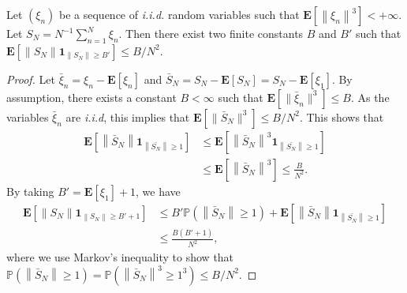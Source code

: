 \documentclass[sigconf]{acmart}
\newcommand\esp[1]{\mathbf{E}\left[#1\right]}
\newcommand\sesp[1]{\mathbf{E}[#1]}
\newcommand\norm[1]{\left\|#1\right\|}
\newcommand\snorm[1]{\|#1\|}
\newcommand\proba[1]{\mathbb{P}\left(#1\right)}
\begin{document}
\begin{lemma}
  \label{lem:concentration}
  Let $(\xi_n)$ be a sequence of \emph{i.i.d.} random variables such
  that $\esp{\norm{\xi_n}^3}<+\infty$. Let
  $S_N=N^{-1}\sum_{n=1}^N\xi_n$. Then there exist two finite constants
  $B$ and $B'$ such that
  $\esp{\norm{S_N}\mathbf{1}_{\norm{S_N}\ge B'}}\le B/N^2$.
\end{lemma}


\begin{proof}%
  Let $\bar{\xi}_n=\xi_n-\sesp{\xi_n}$ and
  $\bar{S}_N=S_N-\esp{S_N}=S_N-\esp{\xi_1}$. By assumption, there
  exists a constant $B<\infty$ such that
  $\sesp{\snorm{\bar{\xi}_n}^3}\le B$. As the variables $\bar{\xi}_n$
  are \emph{i.i.d}, this implies that
  $\sesp{\snorm{\bar{S}_N}^3}\le B/N^2$. This shows that
  \begin{align*}
    \esp{\norm{\bar{S}_N}\mathbf{1}_{\norm{\bar{S_N}}\ge1}}
    &\le \esp{\norm{\bar{S}_N}^3\mathbf{1}_{\norm{\bar{S_N}}\ge1}}\\
    &\le \esp{\norm{\bar{S}_N}^3}\le
      \frac{B}{N^2}. 
  \end{align*}
  By taking $B'=\esp{\xi_1}+1$, we have
  \begin{align*}
    \esp{\norm{S_N}\mathbf{1}_{\norm{S_N}\ge B'+1}}
    &\le
      B'\proba{\norm{\bar{S}_N}\ge1}+\esp{\norm{\bar{S}_N}\mathbf{1}_{\norm{\bar{S_N}}\ge1}}
    \\
    &\le \frac{B(B'+1)}{N^2}, 
  \end{align*}
  where we use Markov's inequality to show that
  $\proba{\norm{\bar{S}_N}\ge1}=\proba{\norm{\bar{S}_N}^3\ge1^3}\le
  B/N^2$.
\end{proof}
\end{document}
